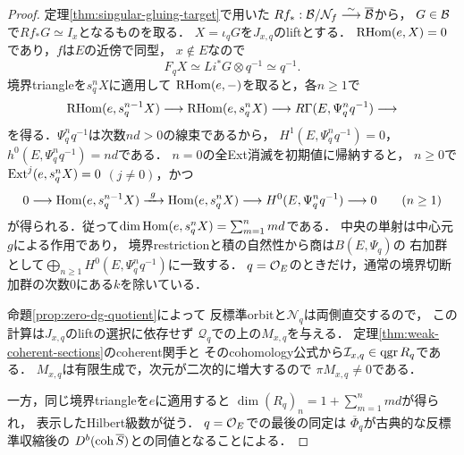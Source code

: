\begin{proof}
定理\ref{thm:singular-gluing-target}で用いた
$Rf_*:\mathcal B/\mathcal N_f\overset{\sim}\longrightarrow
\overline{\mathcal B}$から，
$G\in\mathcal B$で$Rf_*G\simeq I_x$となるものを取る．
$X=\iota_qG$を$J_{x,q}$のliftとする．
$\operatorname{RHom}(e,X)=0$であり，$f$は$E$の近傍で同型，
$x\notin E$なので
\[
 F_qX\simeq Li^*G\otimes q^{-1}\simeq q^{-1}.
\]
境界triangleを$s_q^nX$に適用して
$\operatorname{RHom}(e,-)$を取ると，各$n\ge1$で
\[
 \operatorname{RHom}(e,s_q^{n-1}X)\longrightarrow
 \operatorname{RHom}(e,s_q^nX)\longrightarrow
 R\Gamma(E,\Psi_q^nq^{-1})\longrightarrow
\]
を得る．$\Psi_q^nq^{-1}$は次数$nd>0$の線束であるから，
$H^1(E,\Psi_q^nq^{-1})=0$，
$h^0(E,\Psi_q^nq^{-1})=nd$である．
$n=0$の全Ext消滅を初期値に帰納すると，
$n\ge0$で$\operatorname{Ext}^j(e,s_q^nX)=0$ $(j\ne0)$，かつ
\[
 0\longrightarrow \operatorname{Hom}(e,s_q^{n-1}X)
 \xrightarrow{\ g\ }\operatorname{Hom}(e,s_q^nX)
 \longrightarrow H^0(E,\Psi_q^nq^{-1})
 \longrightarrow0\qquad(n\ge1)
\]
が得られる．従って$\dim\operatorname{Hom}(e,s_q^nX)=\sum_{m=1}^n md$である．
中央の単射は中心元$g$による作用であり，
境界restrictionと積の自然性から商は$B(E,\Psi_q)$の
右加群として$\bigoplus_{n\ge1}H^0(E,\Psi_q^nq^{-1})$に一致する．
$q=\mathcal O_E$のときだけ，通常の境界切断加群の次数$0$にある$k$を除いている．

命題\ref{prop:zero-dg-quotient}によって
反標準orbitと$\mathcal N_q$は両側直交するので，
この計算は$J_{x,q}$のliftの選択に依存せず
$\mathcal Q_q$での上の$M_{x,q}$を与える．
定理\ref{thm:weak-coherent-sections}のcoherent関手と
そのcohomology公式から$\mathcal I_{x,q}\in\operatorname{qgr} R_q$である．
$M_{x,q}$は有限生成で，次元が二次的に増大するので
$\pi M_{x,q}\ne0$である．

一方，同じ境界triangleを$e$に適用すると
$\dim(R_q)_n=1+\sum_{m=1}^n md$が得られ，
表示したHilbert級数が従う．
$q=\mathcal O_E$での最後の同定は
$\overline\Phi_q$が古典的な反標準収縮後の
$D^b(\operatorname{coh}\overline S)$との同値となることによる．
\end{proof}

